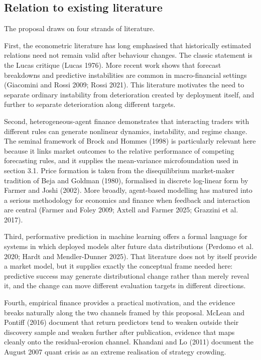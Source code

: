 \documentclass[11pt]{article}
\begin{document}
\subsection{Relation to existing literature}

The proposal draws on four strands of literature.

First, the econometric literature has long emphasised that historically estimated relations need not remain valid after behaviour changes. The classic statement is the Lucas critique (Lucas 1976). More recent work shows that forecast breakdowns and predictive instabilities are common in macro-financial settings (Giacomini and Rossi 2009; Rossi 2021). This literature motivates the need to separate ordinary instability from deterioration created by deployment itself, and further to separate deterioration along different targets.

Second, heterogeneous-agent finance demonstrates that interacting traders with different rules can generate nonlinear dynamics, instability, and regime change. The seminal framework of Brock and Hommes (1998) is particularly relevant here because it links market outcomes to the relative performance of competing forecasting rules, and it supplies the mean-variance microfoundation used in section 3.1. Price formation is taken from the disequilibrium market-maker tradition of Beja and Goldman (1980), formalised in discrete log-linear form by Farmer and Joshi (2002). More broadly, agent-based modelling has matured into a serious methodology for economics and finance when feedback and interaction are central (Farmer and Foley 2009; Axtell and Farmer 2025; Grazzini et al. 2017).

Third, performative prediction in machine learning offers a formal language for systems in which deployed models alter future data distributions (Perdomo et al. 2020; Hardt and Mendler-Dunner 2025). That literature does not by itself provide a market model, but it supplies exactly the conceptual frame needed here: predictive success may generate distributional change rather than merely reveal it, and the change can move different evaluation targets in different directions.

Fourth, empirical finance provides a practical motivation, and the evidence breaks naturally along the two channels framed by this proposal. McLean and Pontiff (2016) document that return predictors tend to weaken outside their discovery sample and weaken further after publication, evidence that maps cleanly onto the residual-erosion channel. Khandani and Lo (2011) document the August 2007 quant crisis as an extreme realisation of strategy crowding.
\end{document}
